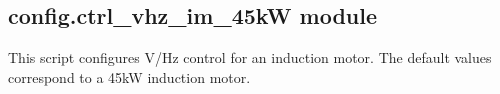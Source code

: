 \documentclass[letterpaper,10pt,english]{sphinxmanual}
\begin{document}
\subsection{config.ctrl\_vhz\_im\_45kW module}
\label{\detokenize{config:module-config.ctrl_vhz_im_45kW}}\label{\detokenize{config:config-ctrl-vhz-im-45kw-module}}
\sphinxAtStartPar
This script configures V/Hz control for an induction motor. The default values
correspond to a 45\sphinxhyphen{}kW induction motor.
\end{document}
